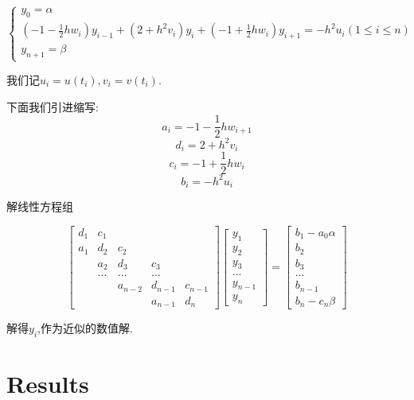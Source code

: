 \documentclass{article}
\begin{document}
		$$	
	\left\{ 
	\begin{array}{lc}
		y_0 = \alpha \\
		(-1-\frac{1}{2}hw_i)y_{i-1}+(2+h^2v_i)y_i+(-1+\frac{1}{2}hw_i)y_{i+1} = -h^2u_i (1\leq i \leq n)\\
		y_{n+1} = \beta
	\end{array}
	\right.$$
	
	我们记$u_i=u(t_i),v_i=v(t_i).$
	
	下面我们引进缩写:
	$$ a_i=-1-\frac{1}{2}hw_{i+1}$$
	$$ d_i=2+h^2v_i$$
	$$c_i=-1+\frac{1}{2}hw_i$$
	$$b_i=-h^2u_i$$
	
	解线性方程组
	
		\begin{equation}
		\left[
		\begin{array}{cccccc}
			d_{1}& c_{1} &  &   \\
			a_{1}& d_{2} &c_{2}&   \\
			&a_{2} &d_{3}&c_{3}       \\
			&... & ...  &...&  \\
			&\quad&a_{n-2} &d_{n-1} &c_{n-1} \\
			&\quad&        &a_{n-1} &d_{n} 
			
		\end{array}
		\right ]
		\left[
		\begin{array}{cccc}
			y_{1}\\
			y_{2}\\
			y_{3}\\
			... \\
			y_{n-1}\\
			y_{n}
		\end{array}
		\right ]
		=
		\left[
		\begin{array}{cccc}
			b_{1}-a_0\alpha \\
			b_{2}\\
			b_{3}\\
			... \\
			b_{n-1}\\
			b_{n}-c_n\beta
		\end{array}
		\right ]
	\end{equation}

    解得$y_i$,作为近似的数值解.
	
	
	\section{Results}
	
\end{document}
